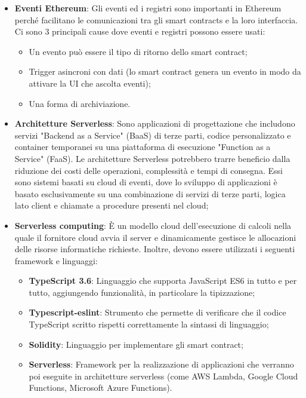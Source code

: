 \begin{itemize}
\item \textbf{Eventi Ethereum}: Gli eventi ed i registri sono importanti in Ethereum perch\'e facilitano le comunicazioni tra gli smart contracts e la loro interfaccia.
Ci sono 3 principali cause dove eventi e registri possono essere usati:
\begin{itemize}
\item Un evento pu\`o essere il tipo di ritorno dello smart contract;
\item Trigger asincroni con dati (lo smart contract genera un evento in modo da attivare la UI che ascolta eventi);
\item Una forma di archiviazione.
\end{itemize}

\item \textbf{Architetture Serverless}: Sono applicazioni di progettazione che includono servizi "Backend as a Service" (BaaS) di terze parti, codice personalizzato e container temporanei su una piattaforma di esecuzione "Function as a Service" (FaaS). Le architetture Serverless potrebbero trarre beneficio dalla riduzione dei costi delle operazioni, complessit\`a e tempi di consegna. Essi sono sistemi basati su cloud di eventi, dove lo sviluppo di applicazioni è basato esclusivamente su una combinazione di servizi di terze parti, logica lato client e chiamate a procedure presenti nel cloud;
\item \textbf{Serverless computing}: È un modello cloud dell'esecuzione di calcoli nella quale il fornitore cloud avvia il server e dinamicamente gestisce le allocazioni delle risorse informatiche richieste.
Inoltre, devono essere utilizzati i seguenti framework e linguaggi:
\begin{itemize}
\item \textbf{TypeScript 3.6}: Linguaggio che supporta JavaScript ES6 in tutto e per tutto, aggiungendo funzionalità, in particolare la tipizzazione;
\item \textbf{Typescript-eslint}: Strumento che permette di verificare che il codice TypeScript scritto rispetti correttamente la sintassi di linguaggio;
\item \textbf{Solidity}: Linguaggio per implementare gli smart contract;
\item \textbf{Serverless}: Framework per la realizzazione di applicazioni che verranno poi eseguite in architetture serverless (come AWS Lambda, Google Cloud Functions, Microsoft Azure Functions).
\end{itemize}

\end{itemize}

